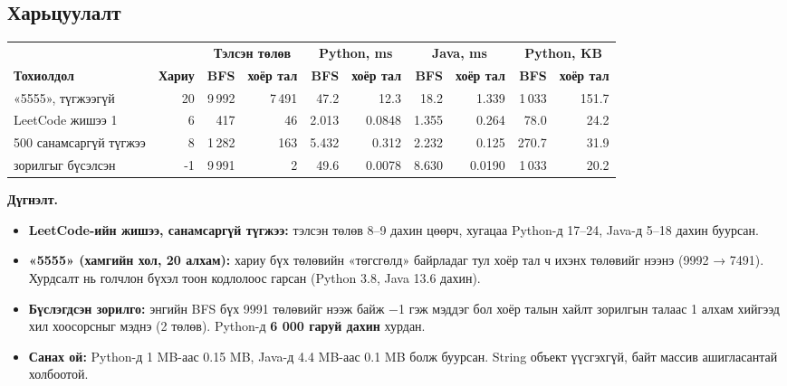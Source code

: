 \documentclass[11pt,a4paper]{article}
\renewcommand{\_}{\oldunderscore\allowbreak}
\begin{document}
\subsection{Харьцуулалт}
\begin{center}
\scriptsize
\setlength{\tabcolsep}{4pt}
\begin{tabular}{lrrrrrrrrr}
\toprule
\multicolumn{2}{c}{} & \multicolumn{2}{c}{\textbf{Тэлсэн төлөв}} & \multicolumn{2}{c}{\textbf{Python, ms}} & \multicolumn{2}{c}{\textbf{Java, ms}} & \multicolumn{2}{c}{\textbf{Python, KB}} \\
\cmidrule(lr){3-4} \cmidrule(lr){5-6} \cmidrule(lr){7-8} \cmidrule(lr){9-10}
\textbf{Тохиолдол} & \textbf{Хариу} & \textbf{BFS} & \textbf{хоёр тал} & \textbf{BFS} & \textbf{хоёр тал} & \textbf{BFS} & \textbf{хоёр тал} & \textbf{BFS} & \textbf{хоёр тал} \\
\midrule
«5555», түгжээгүй & 20 & 9\,992 & 7\,491 & 47.2 & 12.3 & 18.2 & 1.339 & 1\,033 & 151.7 \\
LeetCode жишээ 1 & 6 & 417 & 46 & 2.013 & 0.0848 & 1.355 & 0.264 & 78.0 & 24.2 \\
500 санамсаргүй түгжээ & 8 & 1\,282 & 163 & 5.432 & 0.312 & 2.232 & 0.125 & 270.7 & 31.9 \\
зорилгыг бүсэлсэн & -1 & 9\,991 & 2 & 49.6 & 0.0078 & 8.630 & 0.0190 & 1\,033 & 20.2 \\
\bottomrule
\end{tabular}
\end{center}

\textbf{Дүгнэлт.}
\begin{itemize}
\item \textbf{LeetCode-ийн жишээ, санамсаргүй түгжээ:} тэлсэн төлөв 8–9 дахин цөөрч, хугацаа Python-д 17–24, Java-д 5–18 дахин буурсан.
\item \textbf{«5555» (хамгийн хол, 20 алхам):} хариу бүх төлөвийн «төгсгөлд» байрладаг тул хоёр тал ч ихэнх төлөвийг нээнэ (9992 → 7491). Хурдсалт нь голчлон бүхэл тоон кодлолоос гарсан (Python 3.8, Java 13.6 дахин).
\item \textbf{Бүслэгдсэн зорилго:} энгийн BFS бүх 9991 төлөвийг нээж байж −1 гэж мэддэг бол хоёр талын хайлт зорилгын талаас 1 алхам хийгээд хил хоосорсныг мэднэ (2 төлөв). Python-д \textbf{6 000 гаруй дахин} хурдан.
\item \textbf{Санах ой:} Python-д 1 MB-аас 0.15 MB, Java-д 4.4 MB-аас 0.1 MB болж буурсан. String объект үүсгэхгүй, байт массив ашигласантай холбоотой.
\end{itemize}
\end{document}
